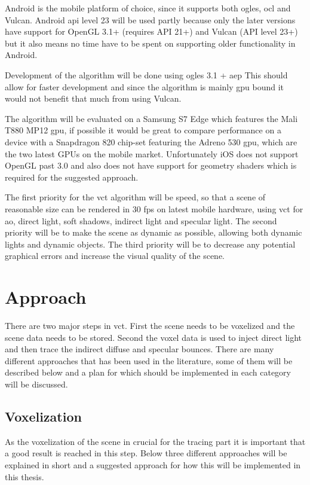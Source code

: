 \documentclass[a4paper, 12pt]{article}
\begin{document}
Android is the mobile platform of choice, since it supports both \gls{ogles}, \gls{ocl} and Vulcan. Android \acrshort{api} level 23 will be used partly because only the later versions have support for OpenGL 3.1+ (requires API 21+) and Vulcan (API level 23+) but it also means no time have to be spent on supporting older functionality in Android.

Development of the algorithm will be done using \gls{ogles} 3.1 + \gls{aep} This should allow for faster development and since the algorithm is mainly \gls{gpu} bound it would not benefit that much from using Vulcan.

The algorithm will be evaluated on a Samsung S7 Edge which features the Mali T880 MP12 \gls{gpu}, if possible it would be great to compare performance on a device with a Snapdragon 820 chip-set featuring the Adreno 530 \gls{gpu}, which are the two latest \glspl{GPU} on the mobile market. Unfortunately iOS does not support OpenGL past 3.0 and also does not have support for geometry shaders which is required for the suggested approach.

The first priority for the \gls{vct} algorithm will be speed, so that a scene of reasonable size can be rendered in 30 fps on latest mobile hardware, using \gls{vct} for \gls{ao}, direct light, soft shadows, indirect light and specular light. The second priority will be to make the scene as dynamic as possible, allowing both dynamic lights and dynamic objects. The third priority will be to decrease any potential graphical errors and increase the visual quality of the scene. 

\section{Approach}
\label{sec:Approach}

There are two major steps in \gls{vct}. First the scene needs to be voxelized and the scene data needs to be stored. Second the voxel data is used to inject direct light and then trace the indirect diffuse and specular bounces. There are many different approaches that has been used in the literature, some of them will be described below and a plan for which should be implemented in each category will be discussed.

\subsection{Voxelization}

As the voxelization of the scene in crucial for the tracing part it is important that a good result is reached in this step. Below three different approaches will be explained in short and a suggested approach for how this will be implemented in this thesis. 
\end{document}
